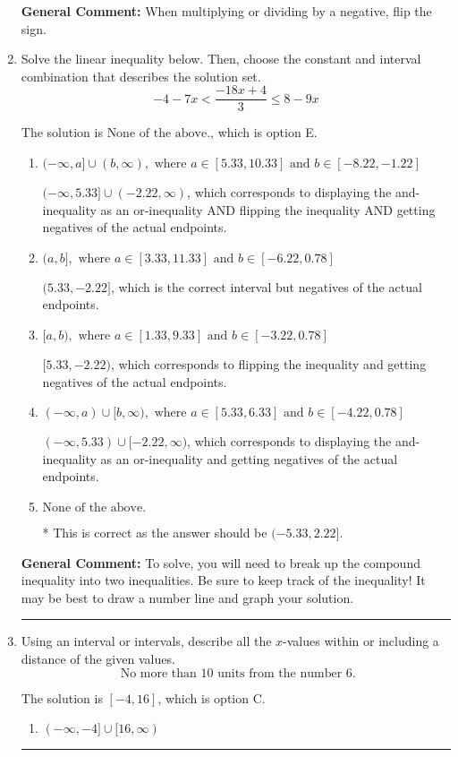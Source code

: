 \documentclass{extbook}[14pt]
\newcommand{\litem}[1]{\item #1

\rule{\textwidth}{0.4pt}}
\begin{document}
\begin{enumerate}
{\textbf{General Comment:} When multiplying or dividing by a negative, flip the sign.
}
\litem{
Solve the linear inequality below. Then, choose the constant and interval combination that describes the solution set.
\[ -4 - 7 x < \frac{-18 x + 4}{3} \leq 8 - 9 x \]

The solution is \( \text{None of the above.} \), which is option E.\begin{enumerate}[label=\Alph*.]
\item \( (-\infty, a] \cup (b, \infty), \text{ where } a \in [5.33, 10.33] \text{ and } b \in [-8.22, -1.22] \)

$(-\infty, 5.33] \cup (-2.22, \infty)$, which corresponds to displaying the and-inequality as an or-inequality AND flipping the inequality AND getting negatives of the actual endpoints.
\item \( (a, b], \text{ where } a \in [3.33, 11.33] \text{ and } b \in [-6.22, 0.78] \)

$(5.33, -2.22]$, which is the correct interval but negatives of the actual endpoints.
\item \( [a, b), \text{ where } a \in [1.33, 9.33] \text{ and } b \in [-3.22, 0.78] \)

$[5.33, -2.22)$, which corresponds to flipping the inequality and getting negatives of the actual endpoints.
\item \( (-\infty, a) \cup [b, \infty), \text{ where } a \in [5.33, 6.33] \text{ and } b \in [-4.22, 0.78] \)

$(-\infty, 5.33) \cup [-2.22, \infty)$, which corresponds to displaying the and-inequality as an or-inequality and getting negatives of the actual endpoints.
\item \( \text{None of the above.} \)

* This is correct as the answer should be $(-5.33, 2.22]$.
\end{enumerate}

\textbf{General Comment:} To solve, you will need to break up the compound inequality into two inequalities. Be sure to keep track of the inequality! It may be best to draw a number line and graph your solution.
}
\litem{
Using an interval or intervals, describe all the $x$-values within or including a distance of the given values.
\[ \text{ No more than } 10 \text{ units from the number } 6. \]

The solution is \( [-4, 16] \), which is option C.\begin{enumerate}[label=\Alph*.]
\item \( (-\infty, -4] \cup [16, \infty) \)


\end{enumerate}}
\end{enumerate}
\end{document}
